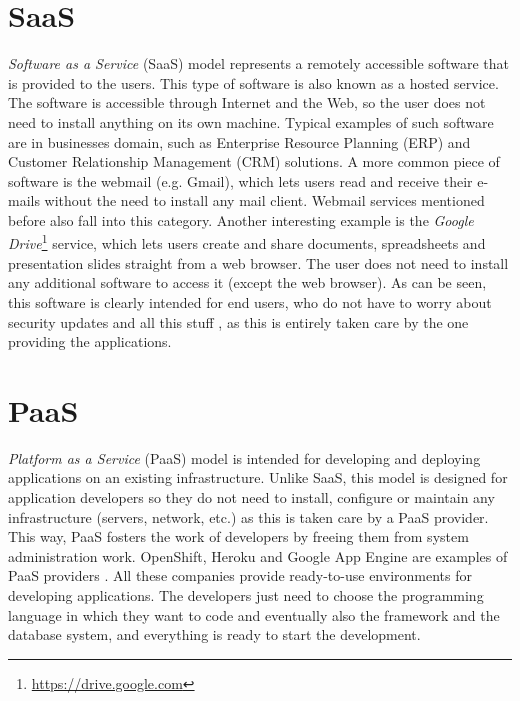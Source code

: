 \section{SaaS}
\textit{Software as a Service} (SaaS) model represents a remotely accessible software that is provided to the users. 
This type of software is also known as a hosted service. 
The software is accessible through Internet and the Web, so the user does not need to install anything on its own machine. 
Typical examples of such software are in businesses domain, such as Enterprise Resource Planning (ERP) and Customer Relationship Management (CRM) solutions. 
A more common piece of software is the webmail (e.g. Gmail), which lets users read and receive their e-mails without the need to install any mail client. 
Webmail services mentioned before also fall into this category. 
Another interesting example is the \textit{Google Drive}\footnote{\url{https://drive.google.com}} service, which lets users create and share documents, spreadsheets and presentation slides straight from a web browser. 
The user does not need to install any additional software to access it (except the web browser). 
As can be seen, this software is clearly intended for end users, who do not have to worry about security updates and all this stuff , as this is entirely taken care by the one providing the applications.



\section{PaaS}
 \textit{Platform as a Service} (PaaS) model is intended for developing and deploying applications on an existing infrastructure.
Unlike SaaS, this model is designed for application developers so they do not need to install, configure or maintain any infrastructure (servers, network, etc.) as this is taken care by a PaaS provider. 
This way, PaaS fosters the work of developers by freeing them from system administration work. 
OpenShift, Heroku and Google App Engine are examples of PaaS providers .
All these companies provide ready-to-use environments for developing applications.
The developers just need to choose the programming language in which they want to code and eventually also the framework and the database system, and everything is ready to start the development.



